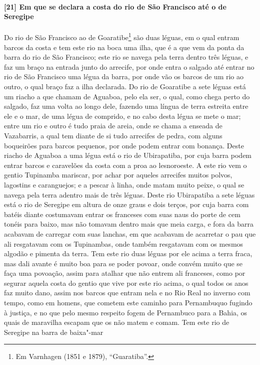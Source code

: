 \begin{linenumbers}
\paragraph{[21] Em que se declara a costa do rio de São Francisco até o de Seregipe} \quad
Do rio de São Francisco ao de Goaratibe\footnote{ Em Varnhagen (1851 e 1879),
``Guaratiba''.} são duas léguas, em o qual entram barcos da costa e tem este rio na boca
uma ilha, que é a que vem da ponta da barra do rio de São Francisco; este rio se navega
pela terra dentro três léguas, e faz um braço na entrada junto do arrecife, por onde entra
o salgado até entrar no rio de São Francisco uma légua da barra, por onde vão os barcos de
um rio ao outro, o qual braço faz a ilha declarada. Do rio de Goaratibe a sete léguas está
um riacho a que chamam de Aguaboa, pelo ela ser, o qual, como chega perto do salgado, faz
uma volta ao longo dele, fazendo uma língua de terra estreita entre ele e o mar, de uma
légua de comprido, e no cabo desta légua se mete o mar; entre um rio e outro é tudo praia
de areia, onde se chama a enseada de Vazabarris, a qual tem diante de si tudo arrecifes de
pedra, com alguns boqueirões para barcos pequenos, por onde podem entrar com bonança.
Deste riacho de Aguaboa a uma légua está o rio de Ubirapatiba, por cuja barra podem entrar
barcos e caravelões da costa com a proa ao lesnoroeste. A este rio vem o gentio Tupinamba
mariscar, por achar por aqueles arrecifes muitos polvos, lagostins e caranguejos; e a
pescar à linha, onde matam muito peixe, o qual se navega pela terra adentro mais de três
léguas. Deste rio Ubirapatiba a sete léguas está o rio de Seregipe em altura de onze graus
e dois terços, por cuja barra com batéis diante costumavam entrar os franceses com suas
naus do porte de cem tonéis para baixo, mas não tomavam dentro mais que meia carga, e fora
da barra acabavam de carregar com suas lanchas, em que acabavam de acarretar o pau que ali
resgatavam com os Tupinambas, onde também resgatavam com os mesmos algodão e pimenta da
terra. Tem este rio duas léguas por ele acima a terra fraca, mas dali avante é muito boa
para se poder povoar, onde convém muito que se faça uma povoação, assim para atalhar que
não entrem ali franceses, como por segurar aquela costa do gentio que vive por este rio
acima, o qual todos os anos faz muito dano, assim nos barcos que entram nela e no Rio Real
no inverno com tempo, como em homens, que cometem este caminho para Pernambuquo fugindo à
justiça, e no que pelo mesmo respeito fogem de Pernambuco para a Bahia, os quais de
maravilha escapam que os não matem e comam. Tem este rio de Seregipe na barra de baixa"-mar

\end{linenumbers}
